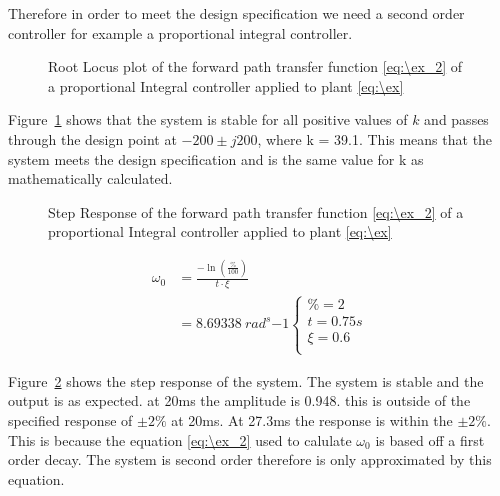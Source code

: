 Therefore in order to meet the design specification we need a second order controller for example a proportional integral controller.


\begin{figure}[ht!]
    \centering
    
    \caption{Root Locus plot of the forward path transfer function \eqref{eq:\ex_2} of a proportional Integral controller applied to plant \eqref{eq:\ex} \appendixamble{\ex}}
    \label{fig:\ex_1}
\end{figure}\FloatBarrier

Figure~\ref{fig:\ex_1} shows that the system is stable for all positive values of $k$ and passes through the design point at $-200 \pm j200$, where k = 39.1. This means that the system meets the design specification and is the same value for k as mathematically calculated.

\begin{figure}[ht!]
    \centering
    
    \caption{Step Response of the forward path transfer function \eqref{eq:\ex_2} of a proportional Integral controller applied to plant \eqref{eq:\ex} \appendixamble{\ex}}
    \label{fig:\ex_2}
\end{figure}\FloatBarrier

\begin{equation}
    \begin{split}
        \omega_{0} &= \frac{-\ln(\frac{\%}{100})}{t\cdot\xi}\\
        &=8.69338\ rad^s{-1}    \begin{cases}
            \%=2 \\
            t=0.75s \\
            \xi=0.6\\
        \end{cases}
    \end{split}\label{eq:\ex_2}
\end{equation}


Figure~\ref{fig:\ex_2} shows the step response of the system. The system is stable and the output is as expected. at 20ms the amplitude is 0.948. this is outside of the specified response of $\pm 2\%$ at 20ms. At 27.3ms the response is within the $\pm 2\%$. This is because the equation \eqref{eq:\ex_2} used to calulate $\omega_0$ is based off a first order decay. The system is second order therefore is only approximated by this equation.